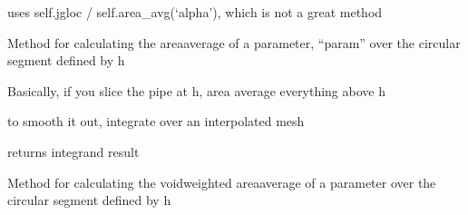 \documentclass[letterpaper,10pt,english]{sphinxmanual}
\begin{document}
\begin{fulllineitems}
\begin{fulllineitems}
\sphinxAtStartPar
uses self.jgloc / self.area\_avg(‘alpha’), which is not a great method

\end{fulllineitems}


\begin{fulllineitems}
\label{\detokenize{api/MARIGOLD.Condition:MARIGOLD.Condition.circ_segment_area_avg}}
\pysigstartsignatures
{}
\pysigstopsignatures
\sphinxAtStartPar
Method for calculating the area\sphinxhyphen{}average of a parameter, “param” over the circular segment defined by h

\sphinxAtStartPar
Basically, if you slice the pipe at h, area average everything above h

\sphinxAtStartPar
to smooth it out, integrate over an interpolated mesh

\sphinxAtStartPar
returns integrand result

\end{fulllineitems}


\begin{fulllineitems}
\label{\detokenize{api/MARIGOLD.Condition:MARIGOLD.Condition.circ_segment_void_area_avg}}
\pysigstartsignatures
{}
\pysigstopsignatures
\sphinxAtStartPar
Method for calculating the void\sphinxhyphen{}weighted area\sphinxhyphen{}average of a parameter over the circular segment defined by h


\end{fulllineitems}
\end{fulllineitems}
\end{document}
